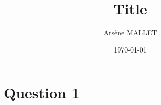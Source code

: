 \documentclass{article}
\title{Title}
\date{\today}
\author{Arsène MALLET}
\begin{document}
\begin{center}
    \huge{\@title}
\end{center}

\section*{Question 1}

\lipsum[1-2]
\end{document}
